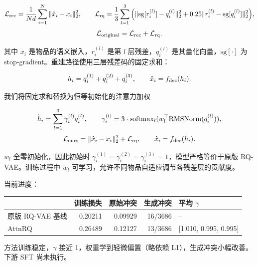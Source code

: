\documentclass[11pt]{article}
\begin{document}
\[
\mathcal{L}_{\rm rec} = \frac{1}{Nd}\sum_{i=1}^N \|\hat{x}_i - x_i\|_2^2,\qquad
\mathcal{L}_{\rm rq} = \frac{1}{3}\sum_{l=1}^3 \Big( \|\mathrm{sg}[r_i^{(l)}] - q_i^{(l)}\|_2^2 + 0.25\|r_i^{(l)} - \mathrm{sg}[q_i^{(l)}]\|_2^2 \Big),
\]
\[
\mathcal{L}_{\rm original} = \mathcal{L}_{\rm rec} + \mathcal{L}_{\rm rq}.
\]

其中 $x_i$ 是物品的语义嵌入，$r_i^{(l)}$ 是第 $l$ 层残差，$q_i^{(l)}$ 是其量化向量，$\mathrm{sg}[\cdot]$ 为 stop-gradient。重建路径使用三层残差码的固定求和：

\[
h_i = q_i^{(1)} + q_i^{(2)} + q_i^{(3)},\qquad \hat{x}_i = f_{\rm dec}(h_i).
\]

我们将固定求和替换为恒等初始化的注意力加权

\[
\tilde h_i = \sum_{l=1}^{3}\gamma_i^{(l)} q_i^{(l)},\qquad
\gamma_i^{(l)} = 3 \cdot {\rm softmax}_l(w_l^\top {\rm RMSNorm}(q_i^{(l)})),
\]
\[
\mathcal{L}_{\rm ours} = \|\hat{x}_i - x_i\|_2^2 + \mathcal{L}_{\rm rq},\qquad \hat{x}_i = f_{\rm dec}(\tilde h_i).
\]

$w_l$ 全零初始化，因此初始时 $\gamma_i^{(1)}=\gamma_i^{(2)}=\gamma_i^{(3)}=1$，模型严格等价于原版 RQ-VAE。训练过程中 $w_l$ 可学习，允许不同物品自适应调节各残差层的贡献度。

当前进度：

\begin{center}
\begin{tabular}{lrrrl}
\toprule
& 训练损失 & 原始冲突 & 生成冲突 & 平均 $\gamma$ \\
\midrule
原版 RQ-VAE 基线 & 0.20211 & 0.09929 & 16/3686 & -- \\
AttnRQ & 0.26489 & 0.12127 & 13/3686 & [1.010, 0.995, 0.995] \\
\bottomrule
\end{tabular}
\end{center}

方法训练稳定，$\gamma$ 接近 1，权重学到轻微偏置（略依赖 L1），生成冲突小幅改善。下游 SFT 尚未执行。
\end{document}
